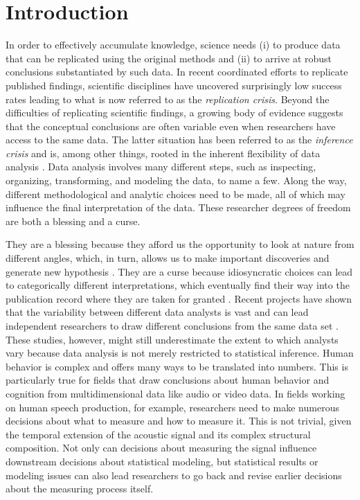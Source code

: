 \documentclass[Review,times,sageh]{sagej}
\begin{document}
\hypertarget{introduction}{%
\section{Introduction}\label{introduction}}

In order to effectively accumulate knowledge, science needs (i) to produce data that can be replicated using the original methods and (ii) to arrive at robust conclusions substantiated by such data.
In recent coordinated efforts to replicate published findings, scientific disciplines have uncovered surprisingly low success rates \citep[e.g.,][]{open2015estimating, camerer2018evaluating} leading to what is now referred to as the \emph{replication crisis}.
Beyond the difficulties of replicating scientific findings, a growing body of evidence suggests that the conceptual conclusions are often variable even when researchers have access to the same data.
The latter situation has been referred to as the \emph{inference crisis} \citep{rotello2015more, starns2019assessing} and is, among other things, rooted in the inherent flexibility of data analysis \citep[often referred to as researcher degrees of freedom:][]{simmons2011false, gelman2014statistical}.
Data analysis involves many different steps, such as inspecting, organizing, transforming, and modeling the data, to name a few.
Along the way, different methodological and analytic choices need to be made, all of which may influence the final interpretation of the data.
These researcher degrees of freedom are both a blessing and a curse.

They are a blessing because they afford us the opportunity to look at nature from different angles, which, in turn, allows us to make important discoveries and generate new hypothesis \citep[e.g.,][]{box1976science, tukey1977exploratory, de2014thought}.
They are a curse because idiosyncratic choices can lead to categorically different interpretations, which eventually find their way into the publication record where they are taken for granted \citep{simmons2011false}.
Recent projects have shown that the variability between different data analysts is vast and can lead independent researchers to draw different conclusions from the same data set \citep[e.g.,][]{silberzahn2018many, starns2019assessing, botvinik2020variability}.
These studies, however, might still underestimate the extent to which analysts vary because data analysis is not merely restricted to statistical inference.
Human behavior is complex and offers many ways to be translated into numbers.
This is particularly true for fields that draw conclusions about human behavior and cognition from multidimensional data like audio or video data.
In fields working on human speech production, for example, researchers need to make numerous decisions about what to measure and how to measure it.
This is not trivial, given the temporal extension of the acoustic signal and its complex structural composition.
Not only can decisions about measuring the signal influence downstream decisions about statistical modeling, but statistical results or modeling issues can also lead researchers to go back and revise earlier decisions about the measuring process itself.
\end{document}
